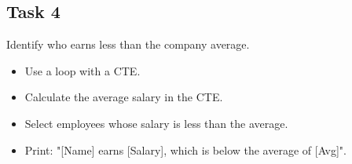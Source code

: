 \documentclass[12pt,a4paper]{article}
\newif\ifshowsolutions
\begin{document}
\subsection*{Task 4}
Identify who earns less than the company average.
\begin{itemize}
    \item Use a loop with a CTE.
    \item Calculate the average salary in the CTE.
    \item Select employees whose salary is less than the average.
    \item Print: "[Name] earns [Salary], which is below the average of [Avg]".
\end{itemize}

\ifshowsolutions
\textbf{Solution:}
\begin{lstlisting}[language=SQL]
DO $$ 
DECLARE
    r RECORD;
BEGIN
    FOR r IN 
        WITH Stats AS (SELECT AVG(salary) as avg_sal FROM employees)
        SELECT e.first_name, e.salary, s.avg_sal
        FROM employees e, Stats s
        WHERE e.salary < s.avg_sal
    LOOP
        RAISE NOTICE '% earns %, which is below the average of %', 
            r.first_name, r.salary, ROUND(r.avg_sal, 2);
    END LOOP;
END $$;
\end{lstlisting}
\fi
\end{document}
